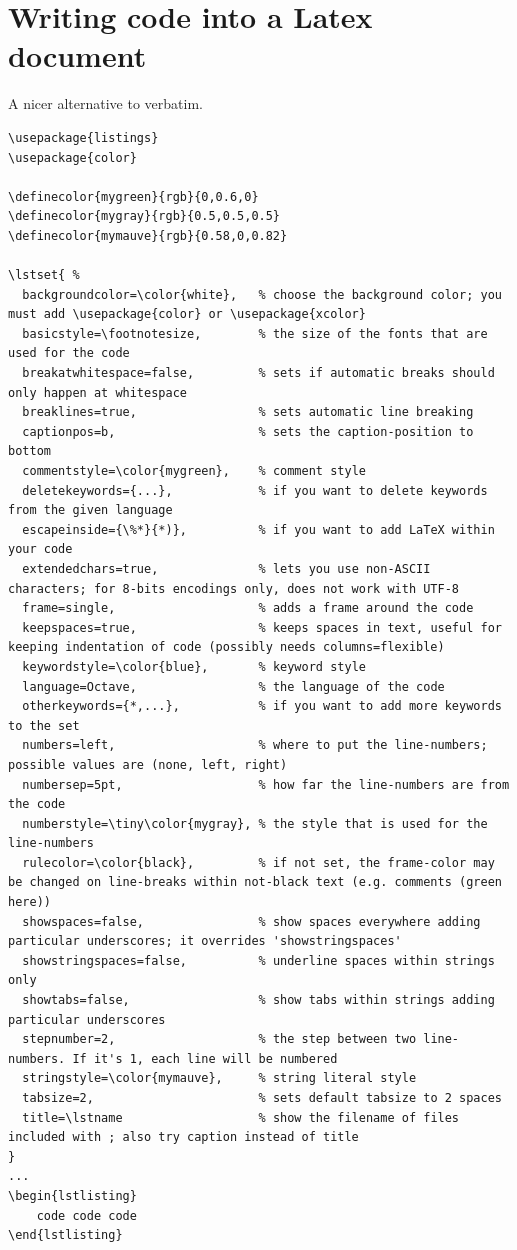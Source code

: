 \documentclass{article}
\begin{document}
\section{Writing code into a Latex document}
A nicer alternative to verbatim.
\begin{verbatim}
\usepackage{listings}
\usepackage{color}

\definecolor{mygreen}{rgb}{0,0.6,0}
\definecolor{mygray}{rgb}{0.5,0.5,0.5}
\definecolor{mymauve}{rgb}{0.58,0,0.82}

\lstset{ %
  backgroundcolor=\color{white},   % choose the background color; you must add \usepackage{color} or \usepackage{xcolor}
  basicstyle=\footnotesize,        % the size of the fonts that are used for the code
  breakatwhitespace=false,         % sets if automatic breaks should only happen at whitespace
  breaklines=true,                 % sets automatic line breaking
  captionpos=b,                    % sets the caption-position to bottom
  commentstyle=\color{mygreen},    % comment style
  deletekeywords={...},            % if you want to delete keywords from the given language
  escapeinside={\%*}{*)},          % if you want to add LaTeX within your code
  extendedchars=true,              % lets you use non-ASCII characters; for 8-bits encodings only, does not work with UTF-8
  frame=single,                    % adds a frame around the code
  keepspaces=true,                 % keeps spaces in text, useful for keeping indentation of code (possibly needs columns=flexible)
  keywordstyle=\color{blue},       % keyword style
  language=Octave,                 % the language of the code
  otherkeywords={*,...},           % if you want to add more keywords to the set
  numbers=left,                    % where to put the line-numbers; possible values are (none, left, right)
  numbersep=5pt,                   % how far the line-numbers are from the code
  numberstyle=\tiny\color{mygray}, % the style that is used for the line-numbers
  rulecolor=\color{black},         % if not set, the frame-color may be changed on line-breaks within not-black text (e.g. comments (green here))
  showspaces=false,                % show spaces everywhere adding particular underscores; it overrides 'showstringspaces'
  showstringspaces=false,          % underline spaces within strings only
  showtabs=false,                  % show tabs within strings adding particular underscores
  stepnumber=2,                    % the step between two line-numbers. If it's 1, each line will be numbered
  stringstyle=\color{mymauve},     % string literal style
  tabsize=2,                       % sets default tabsize to 2 spaces
  title=\lstname                   % show the filename of files included with ; also try caption instead of title
}
...
\begin{lstlisting}
    code code code
\end{lstlisting}
\end{verbatim}
\end{document}

